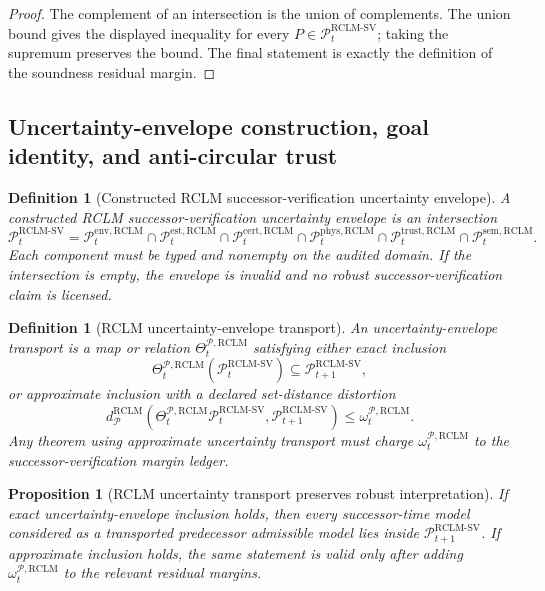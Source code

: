 \documentclass[11pt,a4paper]{article}
\newtheorem{proposition}[theorem]{Proposition}
\newtheorem{definition}[theorem]{Definition}
\newcommand{\Pcal}{\mathcal P}
\newcommand{\RCLM}{\mathrm{RCLM}}
\newcommand{\sem}{\mathrm{sem}}
\newcommand{\phys}{\mathrm{phys}}
\newcommand{\cert}{\mathrm{cert}}
\newcommand{\trust}{\mathrm{trust}}
\newcommand{\est}{\mathrm{est}}
\begin{document}
\begin{proof}
The complement of an intersection is the union of complements. The union bound gives the displayed inequality for every \(P\in\Pcal_t^{\RCLM\text{-}\mathrm{SV}}\); taking the supremum preserves the bound. The final statement is exactly the definition of the soundness residual margin.
\end{proof}

\subsection{Uncertainty-envelope construction, goal identity, and anti-circular trust}

\begin{definition}[Constructed RCLM successor-verification uncertainty envelope]
\label{def:rclm-batch12a-constructed-sv-uncertainty-envelope}
A constructed RCLM successor-verification uncertainty envelope is an intersection
\[
\Pcal_t^{\RCLM\text{-}\mathrm{SV}}
=
\Pcal_t^{\mathrm{env},\RCLM}
\cap
\Pcal_t^{\est,\RCLM}
\cap
\Pcal_t^{\cert,\RCLM}
\cap
\Pcal_t^{\phys,\RCLM}
\cap
\Pcal_t^{\trust,\RCLM}
\cap
\Pcal_t^{\sem,\RCLM}.
\]
Each component must be typed and nonempty on the audited domain. If the intersection is empty, the envelope is invalid and no robust successor-verification claim is licensed.
\end{definition}

\begin{definition}[RCLM uncertainty-envelope transport]
\label{def:rclm-batch12a-uncertainty-envelope-transport}
An uncertainty-envelope transport is a map or relation \(\Theta_t^{\Pcal,\RCLM}\) satisfying either exact inclusion
\[
\Theta_t^{\Pcal,\RCLM}(\Pcal_t^{\RCLM\text{-}\mathrm{SV}})
\subseteq
\Pcal_{t+1}^{\RCLM\text{-}\mathrm{SV}},
\]
or approximate inclusion with a declared set-distance distortion
\[
 d_{\Pcal}^{\RCLM}(\Theta_t^{\Pcal,\RCLM}\Pcal_t^{\RCLM\text{-}\mathrm{SV}},
 \Pcal_{t+1}^{\RCLM\text{-}\mathrm{SV}})
 \le
 \omega_t^{\Pcal,\RCLM}.
\]
Any theorem using approximate uncertainty transport must charge \(\omega_t^{\Pcal,\RCLM}\) to the successor-verification margin ledger.
\end{definition}

\begin{proposition}[RCLM uncertainty transport preserves robust interpretation]
\label{prop:rclm-batch12a-uncertainty-transport-preserves-robust-interpretation}
If exact uncertainty-envelope inclusion holds, then every successor-time model considered as a transported predecessor admissible model lies inside \(\Pcal_{t+1}^{\RCLM\text{-}\mathrm{SV}}\). If approximate inclusion holds, the same statement is valid only after adding \(\omega_t^{\Pcal,\RCLM}\) to the relevant residual margins.
\end{proposition}
\end{document}
